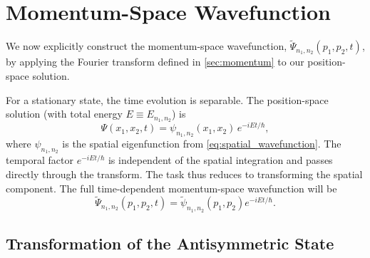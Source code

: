 \section{Momentum-Space Wavefunction}

We now explicitly construct the momentum-space wavefunction,
$\tilde{\Psi}_{n_1, n_2}(p_1, p_2, t)$, by applying the
Fourier transform defined in \cref{sec:momentum} to our
position-space solution.

For a stationary state, the time evolution is separable.
The position-space solution (with total energy $E \equiv E_{n_1, n_2}$) is
\begin{equation}
  \Psi(x_1, x_2, t) = \psi_{n_1, n_2}(x_1, x_2) \, e^{-iEt/\hbar},
\end{equation}
where $\psi_{n_1, n_2}$ is the spatial eigenfunction from
\cref{eq:spatial_wavefunction}.
The temporal factor $e^{-iEt/\hbar}$ is independent of the spatial
integration and passes directly through the transform.
The task thus reduces to transforming the spatial component.
The full time-dependent momentum-space wavefunction will be
\begin{equation}
  \tilde{\Psi}_{n_1, n_2}(p_1, p_2, t) = \tilde{\psi}_{n_1, n_2}(p_1, p_2)
  e^{-iEt/\hbar}.
\end{equation}

\subsection{Transformation of the Antisymmetric State}

